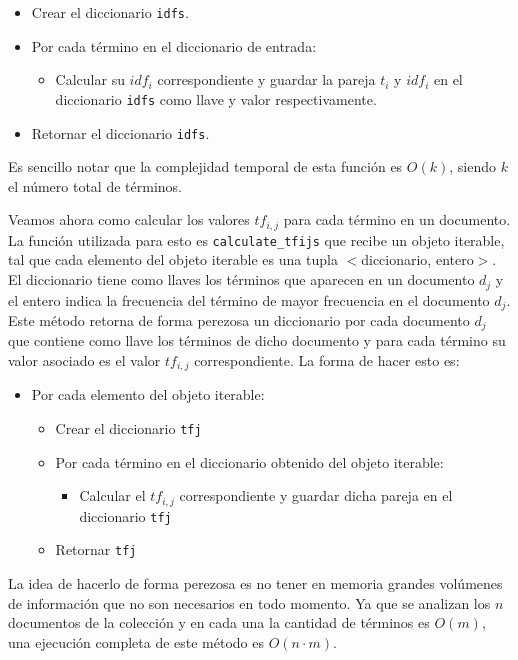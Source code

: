 \documentclass[runningheads]{llncs}
\begin{document}
	\begin{itemize}
		\item Crear el diccionario \verb|idfs|.
		\item Por cada t\'ermino en el diccionario de entrada:
		\begin{itemize}
			\item Calcular su $idf_i$ correspondiente y guardar la pareja $t_i$ y $idf_i$ en el diccionario \verb|idfs| como llave y valor respectivamente.
		\end{itemize}
		\item  Retornar el diccionario \verb|idfs|.
	\end{itemize}
	 
	Es sencillo notar que la complejidad temporal de esta funci\'on es $O(k)$, siendo $k$ el n\'umero total de t\'erminos.
	
	Veamos ahora como calcular los valores $tf_{i,j}$ para cada t\'ermino en un documento. La funci\'on utilizada para esto es \verb|calculate_tfijs| que recibe un objeto iterable, tal que cada elemento del objeto iterable es una tupla $<$diccionario, entero$>$. El diccionario tiene como llaves los t\'erminos que aparecen en un documento $d_j$ y el entero indica la frecuencia del t\'ermino de mayor frecuencia en el documento $d_j$. Este m\'etodo retorna de forma perezosa un diccionario por cada documento $d_j$ que contiene como llave los t\'erminos de dicho documento y para cada t\'ermino su valor asociado es el valor $tf_{i,j}$ correspondiente. La forma de hacer esto es:
	
	\begin{itemize}
		\item Por cada elemento del objeto iterable:
		\begin{itemize}
			\item Crear el diccionario \verb|tfj|
			\item Por cada t\'ermino en el diccionario obtenido del objeto iterable:
			\begin{itemize}
				\item Calcular el $tf_{i,j}$ correspondiente y guardar dicha pareja en el diccionario \verb|tfj|
			\end{itemize}
			\item Retornar \verb|tfj| 
		\end{itemize}
	\end{itemize}
	
	La idea de hacerlo de forma perezosa es no tener en memoria grandes vol\'umenes de informaci\'on que no son necesarios en todo momento. Ya que se analizan los $n$ documentos de la colecci\'on y en cada una la cantidad de t\'erminos es $O(m)$, una ejecuci\'on completa de este m\'etodo es $O(n\cdot m)$.
	
\end{document}
